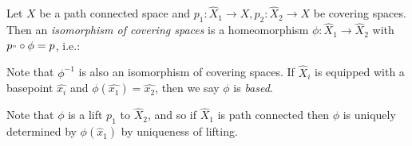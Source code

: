\documentclass[10pt,a4paper]{article}
\begin{document}
Let $X$ be a path connected space and $p_1:\hat{X}_1 \to X, p_2:\hat{X}_2 \to X$ be covering spaces. Then an \emph{isomorphism of covering spaces} is a homeomorphism $\phi:\hat{X}_1 \to \hat{X}_2$ with $p_" \circ \phi = p$, i.e.:
\begin{center}
\end{center}
Note that $\phi^{-1}$ is also an isomorphism of covering spaces. If $\hat{X}_i$ is equipped with a basepoint $\hat{x_i}$ and $\phi(\hat{x_1}) = \hat{x_2}$, then we say $\phi$ is \emph{based}.

Note that $\phi$ is a lift $p_1$ to $\hat{X}_2$, and so if $\hat{X}_1$ is path connected then $\phi$ is uniquely determined by $\phi(\hat{x}_1)$ by uniqueness of lifting.
\end{document}

